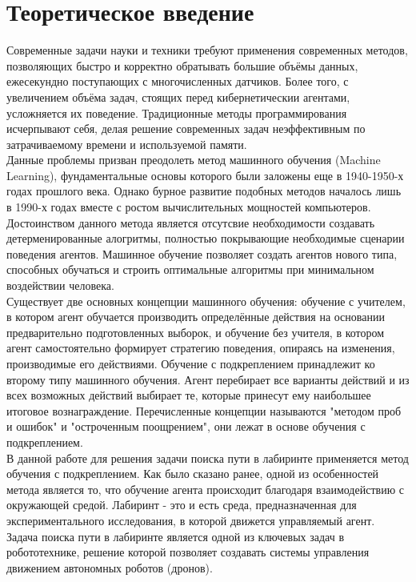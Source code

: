 \documentclass[12pt, a4paper]{report}
\theoremstyle{definition}
\theoremstyle{plain}
\theoremstyle{remark}
\theoremstyle{remark}
\theoremstyle{definition}
\begin{document}
\newpage
\tableofcontents

\newpage
\section{Теоретическое введение}
\label{sec:W1}
Современные задачи науки и техники требуют применения современных методов, позволяющих быстро и корректно обратывать большие объёмы данных, ежесекундно поступающих с многочисленных датчиков. Более того, с увеличением объёма задач, стоящих перед кибернетическии агентами, усложняется их поведение. Традиционные методы программирования исчерпывают себя, делая решение современных задач неэффективным по затрачиваемому времени и используемой памяти.\\

Данные проблемы призван преодолеть метод машинного обучения (Machine Learning), фундаментальные основы которого были заложены еще в 1940-1950-х годах прошлого века. Однако бурное развитие подобных методов началось лишь в 1990-х годах вместе с ростом вычислительных мощностей компьютеров.
Достоинством данного метода является отсутсвие необходимости создавать детерменированные алогритмы, полностью покрывающие необходимые сценарии поведения агентов. Машинное обучение позволяет создать агентов нового типа, способных обучаться и строить оптимальные алгоритмы при минимальном воздействии человека.\\

Существует две основных концепции машинного обучения: обучение с учителем, в котором агент обучается производить определённые действия на основании предварительно подготовленных выборок, и обучение без учителя, в котором агент самостоятельно формирует стратегию поведения, опираясь на изменения, производимые его действиями. Обучение с подкреплением принадлежит ко второму типу машинного обучения. Агент перебирает все варианты действий и из всех возможных действий выбирает те, которые принесут ему наибольшее итоговое вознаграждение. Перечисленные концепции называются "методом проб и ошибок" и "остроченным поощрением", они лежат в основе обучения с подкреплением.\\

В данной работе для решения задачи поиска пути в лабиринте применяется метод обучения с подкреплением. Как было сказано ранее, одной из особенностей метода является то, что обучение агента происходит благодаря взаимодействию с окружающей средой. Лабиринт - это и есть среда, предназначенная для экспериментального исследования, в которой движется управляемый агент. Задача поиска пути в лабиринте является одной из ключевых задач в робототехнике, решение которой позволяет создавать системы управления движением автономных роботов (дронов). \\
\end{document}
